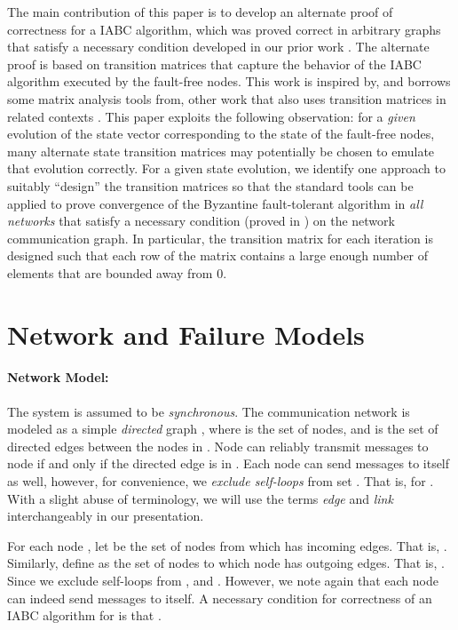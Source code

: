 \documentclass[letterpaper, 12pt]{article}
\begin{document}
The main contribution of this paper is to develop an alternate proof of
correctness for a IABC algorithm, which was proved correct
in arbitrary graphs that satisfy a necessary condition developed
in our prior work \cite{IBA_sync}. 
The alternate proof is based on
transition matrices that capture the behavior of the IABC algorithm
executed by the fault-free nodes.  This work is inspired
by, and borrows some matrix analysis tools from, other work that also uses
transition matrices in 
related contexts \cite{jadbabaie_consensus,Benezit,vaidyaII,Zhang}.
This paper exploits the
following observation: for a {\em given} evolution of the state vector
corresponding to the state of the fault-free nodes, 
many alternate state transition matrices may potentially be chosen to emulate
that evolution correctly. For a given state evolution, we identify one approach
to suitably ``design'' the transition matrices so that the standard tools
can be applied to prove convergence of the Byzantine fault-tolerant
algorithm in {\em all networks} that satisfy a necessary condition
(proved in \cite{us}) on the network communication graph.
In particular, the transition matrix for each iteration
is designed such that each row of the matrix contains a large enough number
of elements that are bounded away from 0.

\section{Network and Failure Models}

\paragraph{Network Model:}
The system is assumed to be {\em synchronous}.
The communication network is modeled as a simple {\em directed} graph , where  is the set of  nodes, and  is the set of directed edges between the nodes in . 
 Node  can reliably transmit messages to node  if and only if
the directed edge  is in .
Each node can send messages to itself as well, however,
for convenience, we {\em exclude self-loops} from set .
That is,  for .
With a slight abuse of terminology, we will use the terms {\em edge}
and {\em link} interchangeably in our presentation.

For each node , let  be the set of nodes from which  has incoming
edges.
That is, .
Similarly, define  as the set of nodes to which node 
has outgoing edges. That is, .
Since we exclude self-loops from ,
 and . 
However, we note again that each node can indeed send messages to itself.
A necessary condition for correctness of an IABC algorithm for  is that
 \cite{IBA_sync}.
\end{document}
